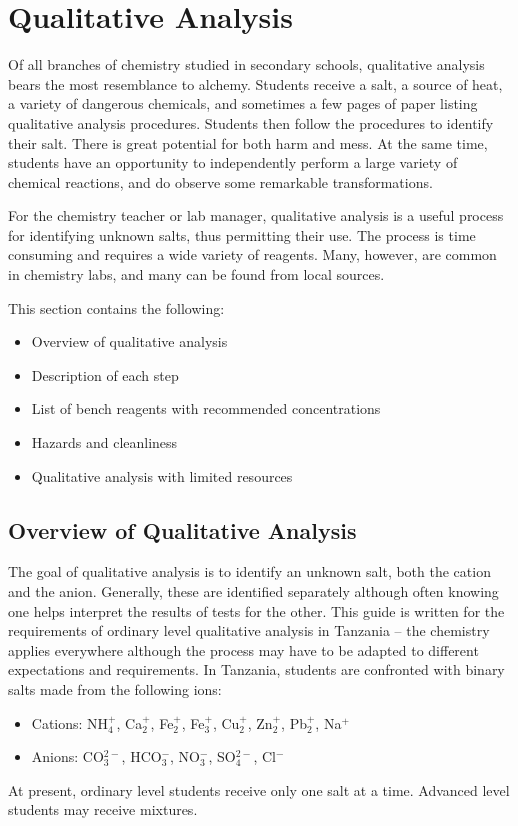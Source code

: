 \chapter{Qualitative Analysis}
\label{cha:qualana}
Of all branches of chemistry studied in secondary schools, 
qualitative analysis bears the most resemblance to alchemy. 
Students receive a salt, 
a source of heat, 
a variety of dangerous chemicals, 
and sometimes a few pages of paper listing 
qualitative analysis procedures. 
Students then follow the procedures to identify their salt. 
There is great potential for both harm and mess. 
At the same time, 
students have an opportunity to independently perform 
a large variety of chemical reactions, 
and do observe some remarkable transformations.

For the chemistry teacher or lab manager, 
qualitative analysis is a useful process for identifying unknown salts, 
thus permitting their use. 
The process is time consuming and requires a wide variety of reagents. 
Many, 
however, 
are common in chemistry labs, 
and many can be found from local sources.

This section contains the following:
\begin{itemize}
\item{Overview of qualitative analysis}
\item{Description of each step}
\item{List of bench reagents with recommended concentrations}
\item{Hazards and cleanliness}
\item{Qualitative analysis with limited resources}
\end{itemize}

\section{Overview of Qualitative Analysis}
The goal of qualitative analysis is to identify an unknown salt, 
both the cation and the anion. 
Generally, 
these are identified separately 
although often knowing one helps interpret 
the results of tests for the other. 
This guide is written for the requirements of 
ordinary level qualitative analysis in Tanzania -- 
the chemistry applies everywhere 
although the process may have to be adapted 
to different expectations and requirements. 
In Tanzania, 
students are confronted with binary salts made from the following ions:
\begin{itemize}
\item{Cations: NH$_{4}^{+}$, 
Ca$_{2}^{+}$, 
Fe$_{2}^{+}$, 
Fe$_{3}^{+}$, 
Cu$_{2}^{+}$, 
Zn$_{2}^{+}$, 
Pb$_{2}^{+}$, 
Na$^{+}$}
\item{Anions: CO$_{3}^{2-}$, 
HCO$_{3}^{-}$, 
NO$_{3}^{-}$, 
SO$_{4}^{2-}$, 
Cl$^{-}$}
\end{itemize}
At present, 
ordinary level students receive only one salt at a time. 
Advanced level students may receive mixtures.

